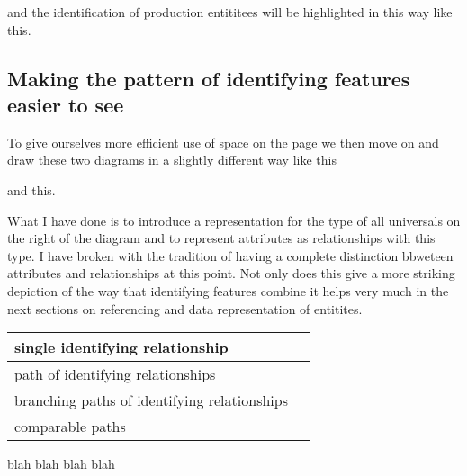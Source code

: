 \documentclass[10pt,a4paper]{article}
\newcommand{\handCraftedImagesFolder}{../handCraftedImages}
\begin{document}
and the identification of production entititees will be highlighted in this way like this.


\subsection{Making the pattern of identifying features easier to see}
To give ourselves more efficient use of space on the page we then move on and draw these two diagrams in a slightly different way like this

and this.

What I have done is to introduce a representation for the type of all universals on the right of the diagram and to represent attributes as relationships with this type. I have broken with the tradition of having a complete distinction bbweteen attributes and relationships at this point. Not only does this give a more striking depiction of the way that identifying features combine it helps very much in the next sections on referencing and data representation of entitites.

\begin{tabular}{| p{5.5cm} | l |}
\hline
single identifying relationship &
\raisebox{-0.35cm}{\scalebox{\thumbnailscale}{
}
} \\
\hline
path of identifying relationships &
\raisebox{-0.35cm}{\scalebox{\thumbnailscale}{
}
} \\
\hline
branching paths of identifying relationships &
\raisebox{-0.85cm}{\scalebox{\thumbnailscale}{
}
} \\
\hline
comparable paths &
\raisebox{-0.65cm}{\scalebox{\thumbnailscale}{
}
} \\
\hline
\end{tabular}

blah blah blah blah\\
\end{document}
